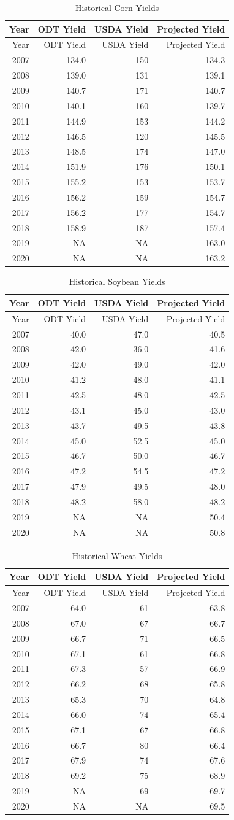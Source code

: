 \documentclass[]{article}
\begin{document}
\begin{longtable}[]{@{}rrrr@{}}
\caption{Historical Corn Yields}\tabularnewline
\toprule
Year & ODT Yield & USDA Yield & Projected Yield\tabularnewline
\midrule
\endfirsthead
\toprule
Year & ODT Yield & USDA Yield & Projected Yield\tabularnewline
\midrule
\endhead
2007 & 134.0 & 150 & 134.3\tabularnewline
2008 & 139.0 & 131 & 139.1\tabularnewline
2009 & 140.7 & 171 & 140.7\tabularnewline
2010 & 140.1 & 160 & 139.7\tabularnewline
2011 & 144.9 & 153 & 144.2\tabularnewline
2012 & 146.5 & 120 & 145.5\tabularnewline
2013 & 148.5 & 174 & 147.0\tabularnewline
2014 & 151.9 & 176 & 150.1\tabularnewline
2015 & 155.2 & 153 & 153.7\tabularnewline
2016 & 156.2 & 159 & 154.7\tabularnewline
2017 & 156.2 & 177 & 154.7\tabularnewline
2018 & 158.9 & 187 & 157.4\tabularnewline
2019 & NA & NA & 163.0\tabularnewline
2020 & NA & NA & 163.2\tabularnewline
\bottomrule
\end{longtable}

\begin{longtable}[]{@{}rrrr@{}}
\caption{Historical Soybean Yields}\tabularnewline
\toprule
Year & ODT Yield & USDA Yield & Projected Yield\tabularnewline
\midrule
\endfirsthead
\toprule
Year & ODT Yield & USDA Yield & Projected Yield\tabularnewline
\midrule
\endhead
2007 & 40.0 & 47.0 & 40.5\tabularnewline
2008 & 42.0 & 36.0 & 41.6\tabularnewline
2009 & 42.0 & 49.0 & 42.0\tabularnewline
2010 & 41.2 & 48.0 & 41.1\tabularnewline
2011 & 42.5 & 48.0 & 42.5\tabularnewline
2012 & 43.1 & 45.0 & 43.0\tabularnewline
2013 & 43.7 & 49.5 & 43.8\tabularnewline
2014 & 45.0 & 52.5 & 45.0\tabularnewline
2015 & 46.7 & 50.0 & 46.7\tabularnewline
2016 & 47.2 & 54.5 & 47.2\tabularnewline
2017 & 47.9 & 49.5 & 48.0\tabularnewline
2018 & 48.2 & 58.0 & 48.2\tabularnewline
2019 & NA & NA & 50.4\tabularnewline
2020 & NA & NA & 50.8\tabularnewline
\bottomrule
\end{longtable}

\begin{longtable}[]{@{}rrrr@{}}
\caption{Historical Wheat Yields}\tabularnewline
\toprule
Year & ODT Yield & USDA Yield & Projected Yield\tabularnewline
\midrule
\endfirsthead
\toprule
Year & ODT Yield & USDA Yield & Projected Yield\tabularnewline
\midrule
\endhead
2007 & 64.0 & 61 & 63.8\tabularnewline
2008 & 67.0 & 67 & 66.7\tabularnewline
2009 & 66.7 & 71 & 66.5\tabularnewline
2010 & 67.1 & 61 & 66.8\tabularnewline
2011 & 67.3 & 57 & 66.9\tabularnewline
2012 & 66.2 & 68 & 65.8\tabularnewline
2013 & 65.3 & 70 & 64.8\tabularnewline
2014 & 66.0 & 74 & 65.4\tabularnewline
2015 & 67.1 & 67 & 66.8\tabularnewline
2016 & 66.7 & 80 & 66.4\tabularnewline
2017 & 67.9 & 74 & 67.6\tabularnewline
2018 & 69.2 & 75 & 68.9\tabularnewline
2019 & NA & 69 & 69.7\tabularnewline
2020 & NA & NA & 69.5\tabularnewline
\bottomrule
\end{longtable}
\end{document}

